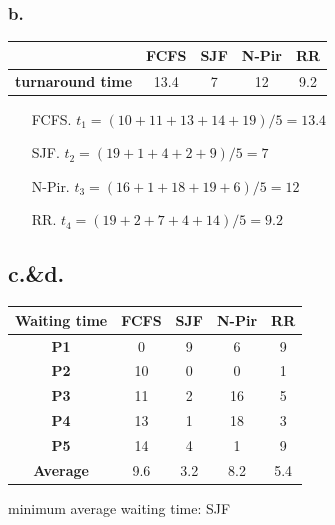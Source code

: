 \documentclass[11pt]{article}
\begin{document}
\subsubsection*{b. }

\begin{table}[H]
    \centering
    \begin{tabular}{|c|c|c|c|c|}
        \hline
                        & \textbf{FCFS} & \textbf{SJF} & \textbf{N-Pir} & \textbf{RR} \\ \hline
        \textbf{turnaround time} & 13.4          & 7            & 12             & 9.2         \\ \hline
    \end{tabular}
\end{table}

\begin{itemize}
    \item[FCFS.] $t_1 = (10+11+13+14+19)/5=13.4$
    \item[SJF.] $t_2 = (19+1+4+2+9)/5=7$
    \item[N-Pir.] $t_3 = (16+1+18+19+6)/5=12 $ 
    \item[RR.] $t_4 = (19+2+7+4+14)/5=9.2$
\end{itemize}

\subsection*{c.\&d.}
\begin{table}[H]
    \centering
    \begin{tabular}{|c|c|c|c|c|}
        \hline
        \textbf{Waiting time} & \textbf{FCFS} & \textbf{SJF} & \textbf{N-Pir} & \textbf{RR} \\ \hline
        \textbf{P1}          & 0             & 9            & 6              & 9           \\ \hline
        \textbf{P2}          & 10            & 0            & 0              & 1           \\ \hline
        \textbf{P3}          & 11            & 2            & 16             & 5           \\ \hline
        \textbf{P4}          & 13            & 1            & 18             & 3           \\ \hline
        \textbf{P5}          & 14            & 4            & 1              & 9           \\ \hline
        \textbf{Average}     & 9.6           & 3.2          & 8.2            & 5.4         \\ \hline
    \end{tabular}
\end{table}
minimum average waiting time: SJF
\end{document}

